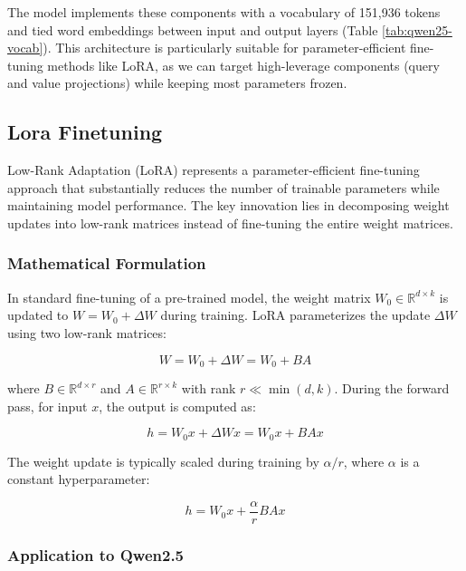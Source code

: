 \documentclass{article}
\begin{document}
The model implements these components with a vocabulary of 151,936 tokens and tied word embeddings between input and output layers (Table \ref{tab:qwen25-vocab}). This architecture is particularly suitable for parameter-efficient fine-tuning methods like LoRA, as we can target high-leverage components (query and value projections) while keeping most parameters frozen.
\subsection*{Lora Finetuning}
Low-Rank Adaptation (LoRA) \cite{hu2022lora} represents a parameter-efficient fine-tuning approach that substantially reduces the number of trainable parameters while maintaining model performance. The key innovation lies in decomposing weight updates into low-rank matrices instead of fine-tuning the entire weight matrices.

\subsubsection*{Mathematical Formulation}

In standard fine-tuning of a pre-trained model, the weight matrix $W_0 \in \mathbb{R}^{d \times k}$ is updated to $W = W_0 + \Delta W$ during training. LoRA parameterizes the update $\Delta W$ using two low-rank matrices:

\begin{equation}
W = W_0 + \Delta W = W_0 + BA
\end{equation}

where $B \in \mathbb{R}^{d \times r}$ and $A \in \mathbb{R}^{r \times k}$ with rank $r \ll \min(d,k)$. During the forward pass, for input $x$, the output is computed as:


\begin{equation}
    h = W_0x + \Delta Wx = W_0x + BAx
    \end{equation}
    
    The weight update is typically scaled during training by $\alpha/r$, where $\alpha$ is a constant hyperparameter:
    
    \begin{equation}
    h = W_0x + \frac{\alpha}{r}BAx
    \end{equation}
    
    \subsubsection*{Application to Qwen2.5}
    
\end{document}
